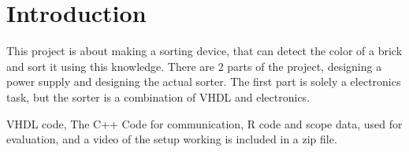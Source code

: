 \section{Introduction}
This project is about making a sorting device, that can detect the color of a brick and sort it using this knowledge. 
There are 2 parts of the project, designing a power supply and designing the actual sorter. 
The first part is solely a electronics task, but the sorter is a combination of VHDL and electronics. 

VHDL code, 
The C++ Code for communication, 
R code and scope data, used for evaluation,
and a video of the setup working is included in a zip file.
